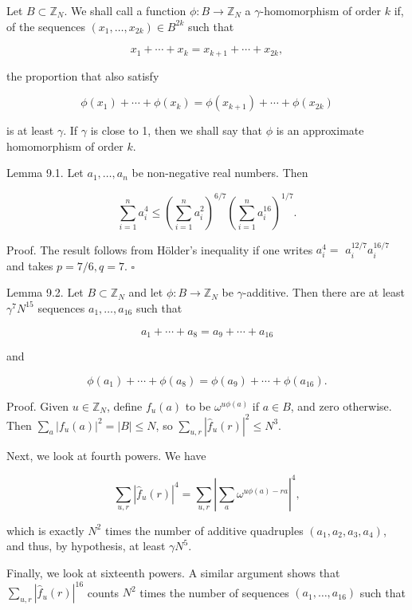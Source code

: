 \documentclass[10pt]{article}
\begin{document}
Let $B \subset \mathbb{Z}_{N}$. We shall call a function $\phi: B \rightarrow \mathbb{Z}_{N}$ a $\gamma$-homomorphism of order $k$ if, of the sequences $\left(x_{1}, \ldots, x_{2 k}\right) \in B^{2 k}$ such that

$$
x_{1}+\cdots+x_{k}=x_{k+1}+\cdots+x_{2 k},
$$

the proportion that also satisfy

$$
\phi\left(x_{1}\right)+\cdots+\phi\left(x_{k}\right)=\phi\left(x_{k+1}\right)+\cdots+\phi\left(x_{2 k}\right)
$$

is at least $\gamma$. If $\gamma$ is close to 1, then we shall say that $\phi$ is an approximate homomorphism of order $k$.

Lemma 9.1. Let $a_{1}, \ldots, a_{n}$ be non-negative real numbers. Then

$$
\sum_{i=1}^{n} a_{i}^{4} \leqslant\left(\sum_{i=1}^{n} a_{i}^{2}\right)^{6 / 7}\left(\sum_{i=1}^{n} a_{i}^{16}\right)^{1 / 7} .
$$

Proof. The result follows from Hölder's inequality if one writes $a_{i}^{4}=$ $a_{i}^{12 / 7} a_{i}^{16 / 7}$ and takes $p=7 / 6, q=7$. \(\square\)

Lemma 9.2. Let $B \subset \mathbb{Z}_{N}$ and let $\phi: B \rightarrow \mathbb{Z}_{N}$ be $\gamma$-additive. Then there are at least $\gamma^{7} N^{15}$ sequences $a_{1}, \ldots, a_{16}$ such that

$$
a_{1}+\cdots+a_{8}=a_{9}+\cdots+a_{16}
$$

and

$$
\phi\left(a_{1}\right)+\cdots+\phi\left(a_{8}\right)=\phi\left(a_{9}\right)+\cdots+\phi\left(a_{16}\right) .
$$

Proof. Given $u \in \mathbb{Z}_{N}$, define $f_{u}(a)$ to be $\omega^{u \phi(a)}$ if $a \in B$, and zero otherwise. Then $\sum_{a}\left|f_{u}(a)\right|^{2}=|B| \leqslant N$, so $\sum_{u, r}\left|\hat{f}_{u}(r)\right|^{2} \leqslant N^{3}$.

Next, we look at fourth powers. We have

$$
\sum_{u, r}\left|\hat{f}_{u}(r)\right|^{4}=\sum_{u, r}\left|\sum_{a} \omega^{u \phi(a)-r a}\right|^{4},
$$

which is exactly $N^{2}$ times the number of additive quadruples $\left(a_{1}, a_{2}, a_{3}, a_{4}\right)$, and thus, by hypothesis, at least $\gamma N^{5}$.

Finally, we look at sixteenth powers. A similar argument shows that $\sum_{u, r}\left|\hat{f}_{u}(r)\right|^{16}$ counts $N^{2}$ times the number of sequences $\left(a_{1}, \ldots, a_{16}\right)$ such that
\end{document}
